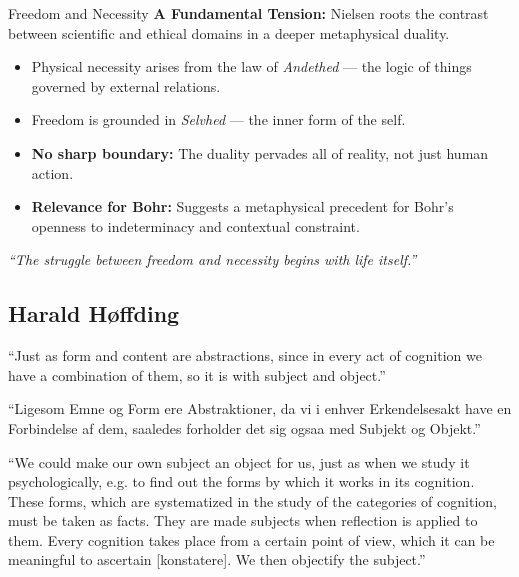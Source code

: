 \documentclass[fleqn]{beamer}
\begin{document}
\begin{frame}{Freedom and Necessity}
  \textbf{A Fundamental Tension:} Nielsen roots the contrast between
  scientific and ethical domains in a deeper metaphysical duality.

  \vspace{1em}
  \begin{itemize}
    \item Physical necessity arises from the law of \textit{Andethed}
      --- the logic of things governed by external relations.
    \item Freedom is grounded in \textit{Selvhed} --- the inner form of the self.
    \item \textbf{No sharp boundary:} The duality pervades all of reality, not just human action.
    \item \textbf{Relevance for Bohr:} Suggests a metaphysical precedent for Bohr’s openness to indeterminacy and contextual constraint.
  \end{itemize}

  \vspace{1em}
  \textit{``The struggle between freedom and necessity begins with life itself.''}
\end{frame}


\subsection{Harald Høffding}

\begin{frame}{\mbox{}}

  ``Just as form and content are abstractions, since in every act of
  cognition we have a combination of them, so it is with subject and
  object.''

  \bigskip ``Ligesom Emne og Form ere Abstraktioner, da vi i enhver
  Erkendelsesakt have en Forbindelse af dem, saaledes forholder det
  sig ogsaa med Subjekt og Objekt.'' \citep[297]{hoffding1910}

   \nocite{hoffding1909}

\end{frame}


\begin{frame}{\mbox{}}

  ``We could make our own subject an object for us, just as when we
  study it psychologically, e.g. to find out the forms by which it
  works in its cognition. These forms, which are systematized in the
  study of the categories of cognition, must be taken as facts. They
  are made subjects when reflection is applied to them. Every
  cognition takes place from a certain point of view, which it can be
  meaningful to ascertain [konstatere]. We then objectify the
  subject.'' \citep{hoffding1910}


\end{frame}
\end{document}

